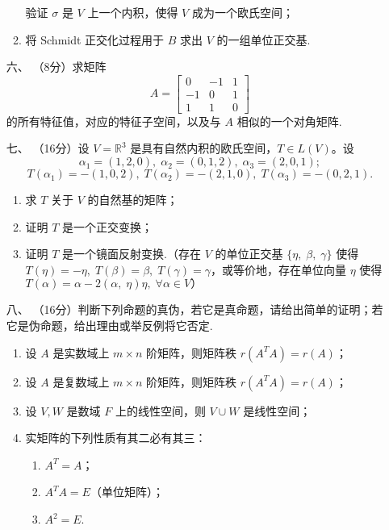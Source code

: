 \begin{enumerate}
\begin{enumerate}[label=(\arabic*)]
        验证 $\sigma$ 是 $V$ 上一个内积，使得 $V$ 成为一个欧氏空间；
        \item 将 Schmidt 正交化过程用于 $B$ 求出 $V$ 的一组单位正交基.
    \end{enumerate}
	\item[六、]（8分）求矩阵
	\[A=\left[\begin{array}{ccc}
    0 & -1 & 1 \\
    -1 & 0 & 1 \\
    1 & 1 & 0
    \end{array}\right]\]
    的所有特征值，对应的特征子空间，以及与 $A$ 相似的一个对角矩阵.
	\item[七、]（16分）设 $V=\mathbb{R}^3$ 是具有自然内积的欧氏空间，$T \in L(V)$。设
	\[\alpha_1=(1,2,0), \;\alpha_2=(0,1,2), \;\alpha_3=(2,0,1);\]
    \[T\left(\alpha_1\right)=-(1,0,2), \;T\left(\alpha_2\right)=-(2,1,0), \;T\left(\alpha_3\right)=-(0,2,1).\]
    \begin{enumerate}[label=(\arabic*)]
        \item 求 $T$ 关于 $V$ 的自然基的矩阵；
        \item 证明 $T$ 是一个正交变换；
        \item 证明 $T$ 是一个镜面反射变换.（存在 $V$ 的单位正交基 $\{\eta,\; \beta,\; \gamma\}$ 使得 $T(\eta)=-\eta,\; T(\beta)=\beta,\; T(\gamma)=\gamma$，或等价地，存在单位向量 $\eta$ 使得 $T(\alpha)=\alpha-2(\alpha,\; \eta) \eta,\; \forall \alpha \in V）$
    \end{enumerate}
	\item[八、]（16分）判断下列命题的真伪，若它是真命题，请给出简单的证明；若它是伪命题，给出理由或举反例将它否定.
    \begin{enumerate}[label=(\arabic*)]
        \item 设 $A$ 是实数域上 $m \times n$ 阶矩阵，则矩阵秩 $r\left(A^T A\right)=r(A)$；
        \item 设 $A$ 是复数域上 $m \times n$ 阶矩阵，则矩阵秩 $r\left(A^T A\right)=r(A)$；
        \item 设 $V, W$ 是数域 $F$ 上的线性空间，则 $V \cup W$ 是线性空间；
        \item 实矩阵的下列性质有其二必有其三：
        \begin{enumerate}
            \item $A^T=A$；
            \item $A^T A=E$（单位矩阵）；
            \item $A^2=E$.
        \end{enumerate}
    \end{enumerate}
\end{enumerate}

\clearpage
